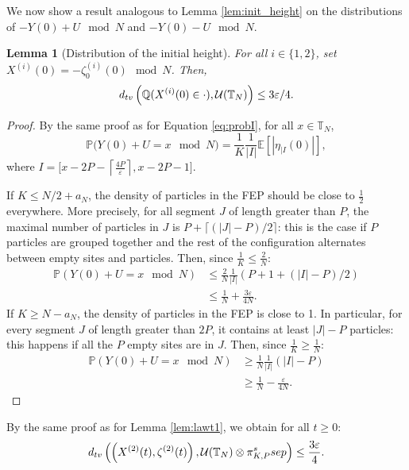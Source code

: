 \documentclass[11pt,a4paper]{article}
\newcommand{\E}{\mathbb{E}}
\newcommand{\T}{\mathbb{T}}
\newcommand{\PP}{\mathbb{P}}
\newcommand{\Q}{\mathbb{Q}}
\newcommand{\SSEP}{\textsc{ssep}}
\newcommand\entc[1]{\lceil #1 \rceil}
\newtheorem{lemma}[theorem]{Lemma}
\newcommand{\eqs}[1]{\begin{equation}#1\end{equation}}
\newcommand{\eq}[2]{\begin{equation}\label{#1}#2\end{equation}}
\begin{document}
We now show a result analogous to Lemma \ref{lem:init_height} on the distributions of $-Y(0) + U\mod N$ and $-Y(0) - U\mod N$.
\begin{lemma}[Distribution of the initial height] \label{lem:init_height2}
For all $i \in \{1,2\}$, set $X^{(i)}(0) = -\zeta^{(i)}_0(0) \mod N$. Then,
\eq{eq:dtv_init_h2}{d_{\textsc{tv}}\left(\Q(X^{(i)}(0) \in \cdot), \mathcal{U}(\T_N)\right) \le 3\varepsilon/4.}
\end{lemma}

\begin{proof}
By the same proof as for Equation \eqref{eq:probI}, for all $x\in \T_N$, 
\eqs{\PP\big(Y(0)+U = x \mod N\big) = \frac{1}{K}\frac{1}{|I|} \E\left[|\eta_{|I}(0)|\right],} where $I = \big[x-2P-\left\lceil \frac{4P}{\varepsilon}\right\rceil, x-2P-1\big]$.

If $K \le N/2 + a_N$, the density of particles in the FEP should be close to $\frac12$ everywhere. More precisely, for all segment $J$ of length greater than $P$, the maximal number of particles in $J$ is $P + \entc{(|J| - P)/2}$: this is the case if $P$ particles are grouped together and the rest of the configuration alternates between empty sites and particles. Then, since $\frac{1}{K}\le \frac{2}{N}$:
\begin{align} 
\PP(Y(0)+U = x \mod N) &\le \frac{2}{N} \frac{1}{|I|}(P + 1+ (|I| - P)/2)\nonumber \\
& \le \frac{1}{N} + \frac{3\varepsilon}{4N}.
\end{align}
If $K \ge N-a_N$, the density of particles in the FEP is close to 1. In particular, for every segment $J$ of length greater than $2P$, it contains at least $|J|-P$ particles: this happens if all the $P$ empty sites are in $J$. Then, since $\frac{1}{K}\ge \frac{1}{N}$:
\begin{align}
\PP(Y(0)+U = x \mod N) &\ge \frac{1}{N} \frac{1}{|I|}(|I| - P)\nonumber \\
& \ge \frac{1}{N} - \frac{\varepsilon}{4N}.
\end{align}
\end{proof}

By the same proof as for Lemma \ref{lem:lawt1}, we obtain for all $t\ge 0$:
 \eq{eq:loiPpetit}{d_{\textsc{tv}}\left(\left(X^{(2)}(t),\zeta^{(2)}(t)\right),\mathcal{U}(\T_N) \otimes \pi_{K,P}^\SSEP\right) \le \frac{3\varepsilon}{4}.}
\end{document}
